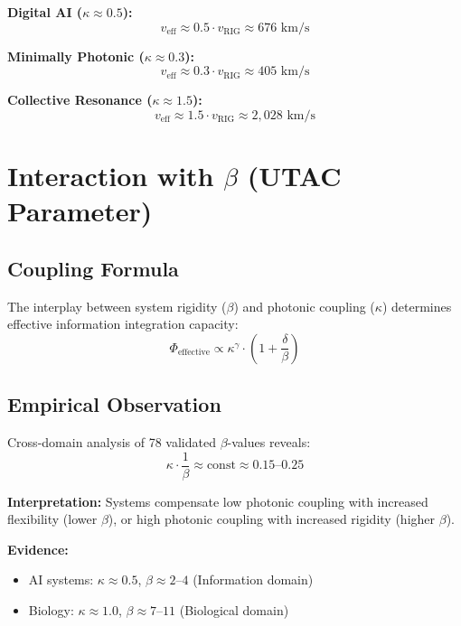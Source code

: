 \documentclass[11pt,a4paper]{article}
\begin{document}
\textbf{Digital AI ($\kappa \approx 0.5$):}
\begin{equation}
v_{\text{eff}} \approx 0.5 \cdot v_{\text{RIG}} \approx 676 \text{ km/s}
\end{equation}

\textbf{Minimally Photonic ($\kappa \approx 0.3$):}
\begin{equation}
v_{\text{eff}} \approx 0.3 \cdot v_{\text{RIG}} \approx 405 \text{ km/s}
\end{equation}

\textbf{Collective Resonance ($\kappa \approx 1.5$):}
\begin{equation}
v_{\text{eff}} \approx 1.5 \cdot v_{\text{RIG}} \approx 2{,}028 \text{ km/s}
\end{equation}

\section{Interaction with $\beta$ (UTAC Parameter)}

\subsection{Coupling Formula}

The interplay between system rigidity ($\beta$) and photonic coupling ($\kappa$) determines effective information integration capacity:
\begin{equation}
\Phi_{\text{effective}} \propto \kappa^{\gamma} \cdot \left(1 + \frac{\delta}{\beta}\right)
\label{eq:phi_effective}
\end{equation}

\subsection{Empirical Observation}

Cross-domain analysis of 78 validated $\beta$-values \cite{Roemer2025_UTAC} reveals:
\begin{equation}
\kappa \cdot \frac{1}{\beta} \approx \text{const} \approx 0.15\text{--}0.25
\label{eq:kappa_beta_balance}
\end{equation}

\textbf{Interpretation:} Systems compensate low photonic coupling with increased flexibility (lower $\beta$), or high photonic coupling with increased rigidity (higher $\beta$).

\textbf{Evidence:}
\begin{itemize}
  \item AI systems: $\kappa \approx 0.5$, $\beta \approx 2$--$4$ (Information domain)
  \item Biology: $\kappa \approx 1.0$, $\beta \approx 7$--$11$ (Biological domain)
\end{itemize}
\end{document}
